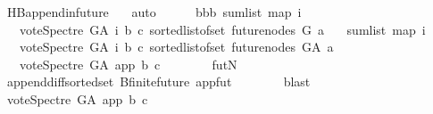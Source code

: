 \begin{isabellebody}
\ HB{}{\isachardot}{\kern0pt}append{\isacharunderscore}{\kern0pt}in{\isacharunderscore}{\kern0pt}future\ {}{\isacharparenleft}{\kern0pt}{}{\isacharparenright}{\kern0pt}\ \isamarkupfalse%
\ auto\isanewline
\ \ \ \ \isamarkupfalse%
\ bbb{\isacharcolon}{\kern0pt}\ {\isachardoublequoteopen}sum{\isacharunderscore}{\kern0pt}list\ {\isacharparenleft}{\kern0pt}map\ {\isacharparenleft}{\kern0pt}{\isasymlambda}i{\isachardot}{\kern0pt}\isanewline
\ \ \ {\isacharparenleft}{\kern0pt}vote{\isacharunderscore}{\kern0pt}Spectre\ G{\isacharunderscore}{\kern0pt}A\ i\ b\ c{\isacharparenright}{\kern0pt}{\isacharparenright}{\kern0pt}\ {\isacharparenleft}{\kern0pt}sorted{\isacharunderscore}{\kern0pt}list{\isacharunderscore}{\kern0pt}of{\isacharunderscore}{\kern0pt}set\ {\isacharparenleft}{\kern0pt}future{\isacharunderscore}{\kern0pt}nodes\ G\ a{\isacharparenright}{\kern0pt}{\isacharparenright}{\kern0pt}{\isacharparenright}{\kern0pt}\isanewline
\ \ {\isacharequal}{\kern0pt}\ sum{\isacharunderscore}{\kern0pt}list\ {\isacharparenleft}{\kern0pt}map\ {\isacharparenleft}{\kern0pt}{\isasymlambda}i{\isachardot}{\kern0pt}\isanewline
\ \ \ {\isacharparenleft}{\kern0pt}vote{\isacharunderscore}{\kern0pt}Spectre\ G{\isacharunderscore}{\kern0pt}A\ i\ b\ c{\isacharparenright}{\kern0pt}{\isacharparenright}{\kern0pt}\ {\isacharparenleft}{\kern0pt}sorted{\isacharunderscore}{\kern0pt}list{\isacharunderscore}{\kern0pt}of{\isacharunderscore}{\kern0pt}set\ {\isacharparenleft}{\kern0pt}future{\isacharunderscore}{\kern0pt}nodes\ G{\isacharunderscore}{\kern0pt}A\ a{\isacharparenright}{\kern0pt}{\isacharparenright}{\kern0pt}{\isacharparenright}{\kern0pt}\isanewline
\ \ {\isacharminus}{\kern0pt}\ {\isacharparenleft}{\kern0pt}vote{\isacharunderscore}{\kern0pt}Spectre\ G{\isacharunderscore}{\kern0pt}A\ app\ b\ c{\isacharparenright}{\kern0pt}{\isachardoublequoteclose}\isanewline
\ \ \ \ \ \ \isamarkupfalse%
\ futN\ \isanewline
\ \ \ \ \ \ \isamarkupfalse%
\ append{\isacharunderscore}{\kern0pt}diff{\isacharunderscore}{\kern0pt}sorted{\isacharunderscore}{\kern0pt}set\ B{}{\isachardot}{\kern0pt}finite{\isacharunderscore}{\kern0pt}future\ appfut\isanewline
\ \ \ \ \ \ \isamarkupfalse%
\ blast\ \isanewline
\ \ \ \ \isamarkupfalse%
\ {\isachardoublequoteopen}vote{\isacharunderscore}{\kern0pt}Spectre\ G{\isacharunderscore}{\kern0pt}A\ app\ b\ c\ {\isacharequal}{\kern0pt}\ {}{\isachardoublequoteclose}\isanewline
\ \ \ \ \ \ \isamarkupfalse%

\end{isabellebody}
